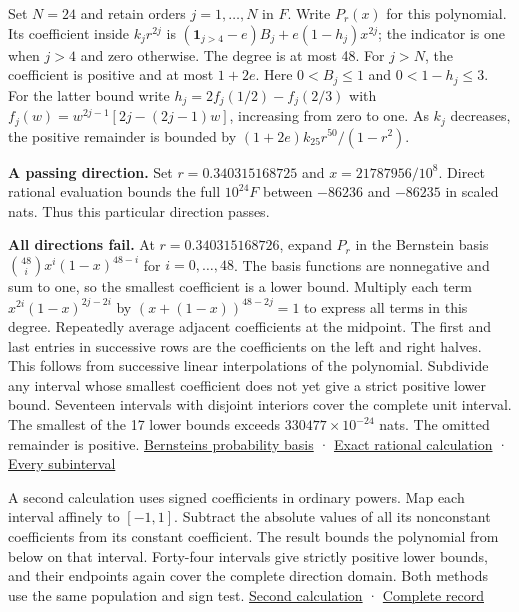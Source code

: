Set \(N=24\) and retain orders \(j=1,\ldots,N\) in \(F\). Write \(P_r(x)\) for this polynomial. Its coefficient inside \(k_jr^{2j}\) is \((\mathbf 1_{j>4}-e)B_j+e(1-h_j)x^{2j}\); the indicator is one when \(j>4\) and zero otherwise. The degree is at most 48. For \(j>N\), the coefficient is positive and at most \(1+2e\). Here \(0<B_j\le1\) and \(0<1-h_j\le3\). For the latter bound write \(h_j=2f_j(1/2)-f_j(2/3)\) with \(f_j(w)=w^{2j-1}[2j-(2j-1)w]\), increasing from zero to one. As \(k_j\) decreases, the positive remainder is bounded by \((1+2e)k_{25}r^{50}/(1-r^2)\).

\textbf{A passing direction.} Set \(r=0.340315168725\) and \(x=21787956/10^8\). Direct rational evaluation bounds the full \(10^{24}F\) between \(-86236\) and \(-86235\) in scaled nats. Thus this particular direction passes.

\textbf{All directions fail.} At \(r=0.340315168726\), expand \(P_r\) in the Bernstein basis \(\binom{48}{i}x^i(1-x)^{48-i}\) for \(i=0,\ldots,48\). The basis functions are nonnegative and sum to one, so the smallest coefficient is a lower bound. Multiply each term \(x^{2i}(1-x)^{2j-2i}\) by \((x+(1-x))^{48-2j}=1\) to express all terms in this degree. Repeatedly average adjacent coefficients at the midpoint. The first and last entries in successive rows are the coefficients on the left and right halves. This follows from successive linear interpolations of the polynomial. Subdivide any interval whose smallest coefficient does not yet give a strict positive lower bound. Seventeen intervals with disjoint interiors cover the complete unit interval. The smallest of the 17 lower bounds exceeds \(330477\times10^{-24}\) nats. The omitted remainder is positive. \href{https://www.mathnet.ru/eng/khmo107}{Bernstein\textquotesingle s probability basis} · \href{https://github.com/sepahead/pid-rs/blob/main/audit/research/angular-ray-monotonicity/bernstein.py}{Exact rational calculation} · \href{https://github.com/sepahead/pid-rs/blob/main/audit/research/angular-ray-monotonicity/bernstein-result.json}{Every subinterval}

A second calculation uses signed coefficients in ordinary powers. Map each interval affinely to \([-1,1]\). Subtract the absolute values of all its nonconstant coefficients from its constant coefficient. The result bounds the polynomial from below on that interval. Forty-four intervals give strictly positive lower bounds, and their endpoints again cover the complete direction domain. Both methods use the same population and sign test. \href{https://github.com/sepahead/pid-rs/blob/main/audit/research/angular-ray-monotonicity/power.py}{Second calculation} · \href{https://github.com/sepahead/pid-rs/blob/main/audit/research/angular-ray-monotonicity/power-result.json}{Complete record}

